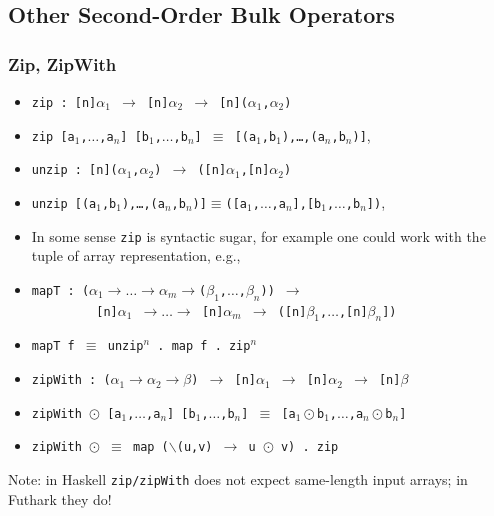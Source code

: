 \documentclass{beamer}
\renewcommand{\emph}[1]{\textcolor{structure}{#1}}
\newcommand{\emp}[1]{\textcolor{DikuRed}{ #1}}
\begin{document}
\subsection{Other Second-Order Bulk Operators}

\begin{frame}[fragile,t]
  \frametitle{Zip, ZipWith}

\begin{itemize}
    \item \emph{\tt zip : [n]$\alpha_1$ $\rightarrow$ [n]$\alpha_2$ $\rightarrow$ [n]($\alpha_1$,$\alpha_2$)}
    \item \emp{\tt zip [a$_1$,$\ldots$,a$_n$] [b$_1$,$\ldots$,b$_n$] $\equiv$ [(a$_1$,b$_1$),\ldots,(a$_n$,b$_n$)]},\pause
    \item \emph{\tt unzip : [n]($\alpha_1$,$\alpha_2$) $\rightarrow$ ([n]$\alpha_1$,[n]$\alpha_2$)}
    \item \emp{\tt unzip [(a$_1$,b$_1$),\ldots,(a$_n$,b$_n$)]$\equiv$([a$_1$,$\ldots$,a$_n$],[b$_1$,$\ldots$,b$_n$])},\pause\medskip

    \item In some sense {\tt zip} is syntactic sugar, for example one could work with the
            tuple of array representation, e.g.,
    \item \emp{\tt mapT : ($\alpha_1\rightarrow\ldots\rightarrow\alpha_m\rightarrow$($\beta_1$,$\ldots$,$\beta_n$)) $\rightarrow$}\\ 
          \emp{\tt~~~~~~~~~[n]$\alpha_1$ $\rightarrow\ldots\rightarrow$ [n]$\alpha_m$ $\rightarrow$ ([n]$\beta_1$,$\ldots$,[n]$\beta_n$])}
    \item \emph{\tt mapT f $\equiv$ unzip$^n$ . map f . zip$^n$}\pause\medskip

    \item {\tt zipWith : ($\alpha_1\rightarrow\alpha_2\rightarrow\beta$) $\rightarrow$ [n]$\alpha_1$ $\rightarrow$ [n]$\alpha_2$ $\rightarrow$ [n]$\beta$}
    \item {\tt zipWith $\odot$ [a$_1$,$\ldots$,a$_n$] [b$_1$,$\ldots$,b$_n$] $\equiv$ [a$_1\odot$b$_1$,$\ldots$,a$_n\odot$b$_n$]}
    \item {\tt zipWith $\odot$ $\equiv$ map ($\backslash$(u,v) $\rightarrow$ u $\odot$ v) . zip}
\end  {itemize}

Note: in Haskell {\tt zip/zipWith} does not expect same-length input arrays; in Futhark they do!

\end{frame}
\end{document}
